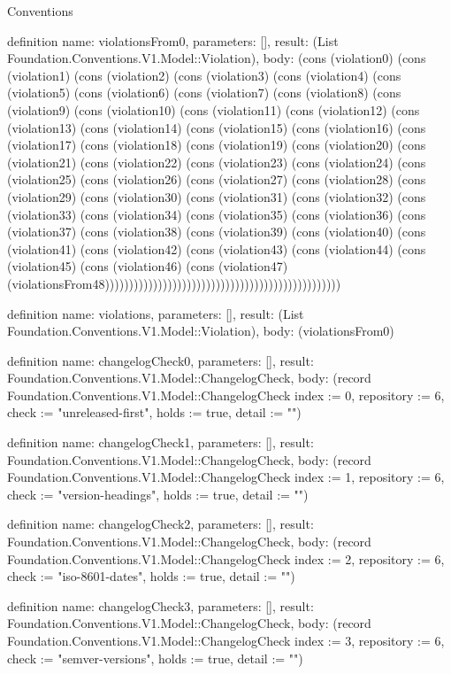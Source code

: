 \begin{lexlean}{Conventions}
\begin{semanticmodule}
definition{
  name: violationsFrom0,
  parameters: [],
  result: (List Foundation.Conventions.V1.Model::Violation),
  body: (cons (violation0) (cons (violation1) (cons (violation2) (cons (violation3) (cons (violation4) (cons (violation5) (cons (violation6) (cons (violation7) (cons (violation8) (cons (violation9) (cons (violation10) (cons (violation11) (cons (violation12) (cons (violation13) (cons (violation14) (cons (violation15) (cons (violation16) (cons (violation17) (cons (violation18) (cons (violation19) (cons (violation20) (cons (violation21) (cons (violation22) (cons (violation23) (cons (violation24) (cons (violation25) (cons (violation26) (cons (violation27) (cons (violation28) (cons (violation29) (cons (violation30) (cons (violation31) (cons (violation32) (cons (violation33) (cons (violation34) (cons (violation35) (cons (violation36) (cons (violation37) (cons (violation38) (cons (violation39) (cons (violation40) (cons (violation41) (cons (violation42) (cons (violation43) (cons (violation44) (cons (violation45) (cons (violation46) (cons (violation47) (violationsFrom48)))))))))))))))))))))))))))))))))))))))))))))))))
}

definition{
  name: violations,
  parameters: [],
  result: (List Foundation.Conventions.V1.Model::Violation),
  body: (violationsFrom0)
}

definition{
  name: changelogCheck0,
  parameters: [],
  result: Foundation.Conventions.V1.Model::ChangelogCheck,
  body: (record Foundation.Conventions.V1.Model::ChangelogCheck {index := 0, repository := 6, check := "unreleased-first", holds := true, detail := ""})
}

definition{
  name: changelogCheck1,
  parameters: [],
  result: Foundation.Conventions.V1.Model::ChangelogCheck,
  body: (record Foundation.Conventions.V1.Model::ChangelogCheck {index := 1, repository := 6, check := "version-headings", holds := true, detail := ""})
}

definition{
  name: changelogCheck2,
  parameters: [],
  result: Foundation.Conventions.V1.Model::ChangelogCheck,
  body: (record Foundation.Conventions.V1.Model::ChangelogCheck {index := 2, repository := 6, check := "iso-8601-dates", holds := true, detail := ""})
}

definition{
  name: changelogCheck3,
  parameters: [],
  result: Foundation.Conventions.V1.Model::ChangelogCheck,
  body: (record Foundation.Conventions.V1.Model::ChangelogCheck {index := 3, repository := 6, check := "semver-versions", holds := true, detail := ""})
}


\end{semanticmodule}
\end{lexlean}
